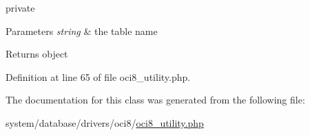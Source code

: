 private 
\begin{DoxyParams}{Parameters}
{\em string} & the table name \\
\hline
\end{DoxyParams}
\begin{DoxyReturn}{Returns}
object 
\end{DoxyReturn}


Definition at line 65 of file oci8\-\_\-utility.\-php.



The documentation for this class was generated from the following file\-:\begin{DoxyCompactItemize}
\item 
system/database/drivers/oci8/\hyperlink{oci8__utility_8php}{oci8\-\_\-utility.\-php}\end{DoxyCompactItemize}
